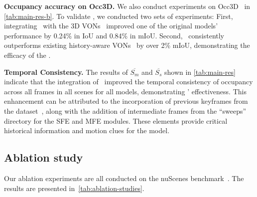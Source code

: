 \noindent\textbf{Occupancy accuracy on Occ3D.} We also conduct experiments on Occ3D~\cite{Occ3D} in \cref{tab:main-res-b}. To validate \ours, we conducted two sets of experiments: First, integrating \ours\ with the 3D VONs~\cite{surroundOcc,viewformer} improved one of the original models'~\cite{viewformer} performance by 0.24\% in IoU and 0.84\% in mIoU. Second, \ours\ consistently outperforms existing history-aware VONs~\cite{opus,bevdet,SparseOcc_Liu,fb_occ} by over 2\% mIoU, demonstrating the efficacy of the \ours.


\noindent\textbf{Temporal Consistency.} The results of $\overline{S_m}$ and $\overline{S_s}$ shown in \cref{tab:main-res} indicate that the integration of \ours\ improved the temporal consistency of occupancy across all frames in all scenes for all models, demonstrating \ours' effectiveness. This enhancement can be attributed to the incorporation of previous keyframes from the dataset~\cite{nuScenes,Occ3D}, along with the addition of intermediate frames from the ``sweeps''~\cite{nuScenes} directory for the SFE and MFE modules. These elements provide critical historical information and motion clues for the model.

\subsection{Ablation study}

Our ablation experiments are all conducted on the nuScenes benchmark~\cite{nuScenes}. The results are presented in~\cref{tab:ablation-studies}.

